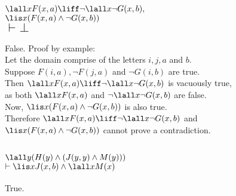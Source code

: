 \documentclass[10pt, letterpaper, titlepage]{article}
\begin{document}
\begin{multicols}{2}
            \subsection{$\lall x F(x,a)\liff \neg \lall x \neg G(x,b),$\\
                $\lis x(F(x,a)\land \neg G(x,b))$\\
                $\vdash \bot$}
                False. Proof by example:\\
                Let the domain comprise of the letters $i, j, a$ and $b$.\\
                Suppose $F(i,a), \lnot F(j, a)$ and $\lnot G(i, b)$ are true. \\
                Then $\lall x F(x,a)\liff \neg \lall x \neg G(x,b)$ is vacuously true, \\
                as both $\lall x F(x,a)$ and $\neg \lall x \neg G(x,b)$ are false.\\
                Now, $\lis x(F(x,a)\land \neg G(x,b))$ is also true.\\
                Therefore $\lall x F(x,a)\liff \neg \lall x \neg G(x,b)$ and \\
                    $\lis x(F(x,a)\land \neg G(x,b))$ cannot prove a contradiction.
    
            \subsection{$\lall y (H(y)\land (J(y,y)\land M(y)))$\\
                $\vdash \lis x J(x,b)\land \lall x M(x)$}
                True.\\
        \end{multicols}
\end{document}
